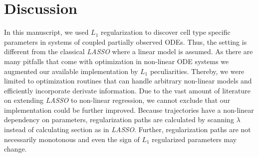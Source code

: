 \documentclass{bioinfo}
\begin{document}
%
%









%
%






\section{Discussion}
In this manuscript, we used $L_1$ regularization to discover cell type specific parameters in systems of coupled partially observed ODEs.
Thus, the setting is different from the classical \emph{LASSO} where a linear model is assumed.
As there are many pitfalls that come with optimization in non-linear ODE systems we augmented our available implementation by $L_1$ peculiarities.
Thereby, we were limited to optimization routines that can handle arbitrary non-linear models and efficiently incorporate derivate information.
Due to the vast amount of literature on extending \emph{LASSO} to non-linear regression, we cannot exclude that our implementation could be further improved.
Because trajectories have a non-linear dependency on parameters, regularization paths are calculated by scanning $\lambda$ instead of calculating section as in \emph{LASSO}.
Further, regularization paths are not necessarily monotonous and even the sign of $L_1$ regularized parameters may change.
\end{document}
